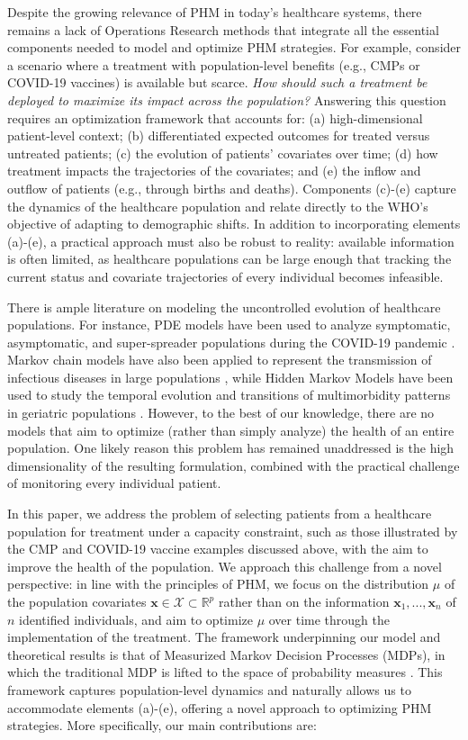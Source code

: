 \documentclass[12pt,a4paper]{article}
\newcommand{\bx}{\mathbf{x}}
\begin{document}
Despite the growing relevance of PHM in today's healthcare systems, there remains a lack of Operations Research methods that integrate all the essential components needed to model and optimize PHM strategies. For example, consider a scenario where a treatment with population-level benefits (e.g., CMPs or COVID-19 vaccines) is available but scarce. {\it How should such a treatment be deployed to maximize its impact across the population?} Answering this question requires an optimization framework that accounts for: (a) high-dimensional patient-level context; (b) differentiated expected outcomes for treated versus untreated patients; (c) the evolution of patients' covariates over time; (d) how treatment impacts the trajectories of the covariates; and (e) the inflow and outflow of patients (e.g., through births and deaths).
Components (c)-(e) capture the dynamics of the healthcare population and relate directly to the WHO's objective of adapting to demographic shifts. In addition to incorporating elements (a)-(e), a practical approach must also be robust to reality: available information is often limited, as healthcare populations can be large enough that tracking the current status and covariate trajectories of every individual becomes infeasible.


There is ample literature on modeling the uncontrolled evolution of healthcare populations. For instance, PDE models have been used to analyze symptomatic, asymptomatic, and super-spreader populations during the COVID-19 pandemic \citep{PDE_nature}. Markov chain models have also been applied to represent the transmission of infectious diseases in large populations \citep{yaesoubi}, while Hidden Markov Models have been used to study the temporal evolution and transitions of multimorbidity patterns in geriatric populations \citep{roso}. However, to the best of our knowledge, there are no models that aim to optimize (rather than simply analyze) the health of an entire population. One likely reason this problem has remained unaddressed is the high dimensionality of the resulting formulation, combined with the practical challenge of monitoring every individual patient. 


In this paper, we address the problem of selecting patients from a healthcare population for treatment under a capacity constraint, such as those illustrated by the CMP and COVID-19 vaccine examples discussed above, with the aim to improve the health of the population. We approach this challenge from a novel perspective: in line with the principles of PHM, we focus on the distribution $\mu$ of the population covariates $\bx\in \mathcal{X} \subset \mathbb{R}^p$ rather than on the information $\bx_1,...,\bx_n $ of $n$ identified individuals, and aim to optimize $\mu$ over time through the implementation of the treatment. The framework underpinning our model and theoretical results is that of Measurized Markov Decision Processes (MDPs), in which the traditional MDP is lifted to the space of probability measures \citep{measurized}. 
This framework captures population-level dynamics and naturally allows us to accommodate elements (a)-(e), offering a novel approach to optimizing PHM strategies. 
More specifically, our main contributions are:
	
\end{document}
